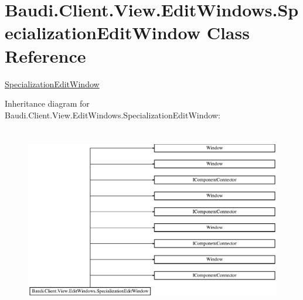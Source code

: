 \hypertarget{class_baudi_1_1_client_1_1_view_1_1_edit_windows_1_1_specialization_edit_window}{}\section{Baudi.\+Client.\+View.\+Edit\+Windows.\+Specialization\+Edit\+Window Class Reference}
\label{class_baudi_1_1_client_1_1_view_1_1_edit_windows_1_1_specialization_edit_window}


\hyperlink{class_baudi_1_1_client_1_1_view_1_1_edit_windows_1_1_specialization_edit_window}{Specialization\+Edit\+Window}  


Inheritance diagram for Baudi.\+Client.\+View.\+Edit\+Windows.\+Specialization\+Edit\+Window\+:\begin{figure}[H]
\begin{center}
\leavevmode
\includegraphics[height=8.187134cm]{class_baudi_1_1_client_1_1_view_1_1_edit_windows_1_1_specialization_edit_window}
\end{center}
\end{figure}
